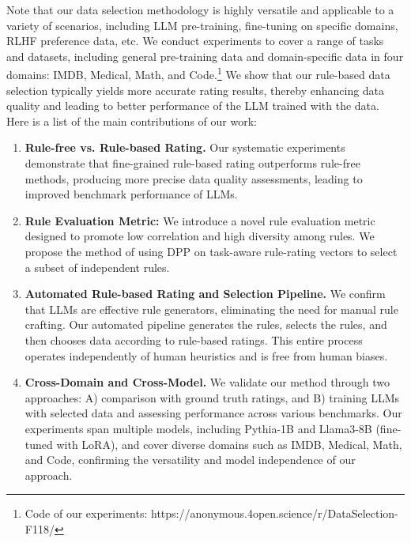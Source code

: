 \documentclass{article}
\begin{document}
Note that our data selection methodology is highly versatile and applicable to a variety of scenarios, including LLM pre-training, fine-tuning on specific domains, RLHF preference data, etc. We conduct experiments to cover a range of tasks and datasets, including general pre-training data and domain-specific data in four domains: IMDB, Medical, Math, and Code.\footnote{Code of our experiments: https://anonymous.4open.science/r/DataSelection-F118/} We show that our rule-based data selection typically yields more accurate rating results, thereby enhancing data quality and leading to better performance of the LLM trained with the data. Here is a list of the main contributions of our work:
\begin{enumerate}[left=0pt,nosep]
    \item \textbf{Rule-free vs. Rule-based Rating.}  Our systematic experiments demonstrate that fine-grained rule-based rating outperforms rule-free methods, producing more precise data quality assessments, leading to improved benchmark performance of LLMs.

    \item \textbf{Rule Evaluation Metric:} We introduce a novel rule evaluation metric designed to promote low correlation and high diversity among rules. We propose the method of using DPP on task-aware rule-rating vectors to select a subset of independent rules.

    \item \textbf{Automated Rule-based Rating and Selection Pipeline.} We confirm that LLMs are effective rule generators, eliminating the need for manual rule crafting. Our automated pipeline generates the rules, selects the rules, and then chooses data according to rule-based ratings. This entire process operates independently of human heuristics and is free from human biases.

    \item \textbf{Cross-Domain and Cross-Model.} We validate our method through two approaches: A) comparison with ground truth ratings, and B) training LLMs with selected data and assessing performance across various benchmarks. Our experiments span multiple models, including Pythia-1B and Llama3-8B (fine-tuned with LoRA), and cover diverse domains such as IMDB, Medical, Math, and Code, confirming the versatility and model independence of our approach.

\end{enumerate}
\end{document}
